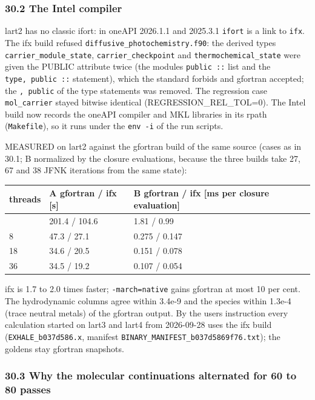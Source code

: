 \documentclass[english,a4paper]{my_memo}
\begin{document}
\subsubsection{30.2 The Intel compiler}\label{302-the-intel-compiler}

lart2 has no classic ifort: in oneAPI 2026.1.1 and 2025.3.1 \texttt{ifort} is a link
to \texttt{ifx}. The ifx build refused \texttt{diffusive\_photochemistry.f90}: the derived
types \texttt{carrier\_module\_state}, \texttt{carrier\_checkpoint} and \texttt{thermochemical\_state}
were given the PUBLIC attribute twice (the module\textquotesingle s \texttt{public\ ::} list and the
\texttt{type,\ public\ ::} statement), which the standard forbids and gfortran
accepted; the \texttt{,\ public} of the type statements was removed. The regression
case \texttt{mol\_carrier} stayed bitwise identical (REGRESSION\_REL\_TOL=0). The Intel
build now records the oneAPI compiler and MKL libraries in its rpath
(\texttt{Makefile}), so it runs under the \texttt{env\ -i} of the run scripts.

MEASURED on lart2 against the gfortran build of the same source (cases as
in 30.1; B normalized by the closure evaluations, because the three builds
take 27, 67 and 38 JFNK iterations from the same state):

{\def\LTcaptype{none} %
{\small
\begin{longtable}[]{@{}lll@{}}
\toprule\noalign{}
threads & A gfortran / ifx {[}s{]} & B gfortran / ifx {[}ms per closure evaluation{]} \\
\midrule\noalign{}
\endhead
\bottomrule\noalign{}
\endlastfoot
1 & 201.4 / 104.6 & 1.81 / 0.99 \\
8 & 47.3 / 27.1 & 0.275 / 0.147 \\
18 & 34.6 / 20.5 & 0.151 / 0.078 \\
36 & 34.5 / 19.2 & 0.107 / 0.054 \\
\end{longtable}
}
}

ifx is 1.7 to 2.0 times faster; \texttt{-march=native} gains gfortran at most 10
per cent. The hydrodynamic columns agree within 3.4e-9 and the species
within 1.3e-4 (trace neutral metals) of the gfortran output. By the user\textquotesingle s
instruction every calculation started on lart3 and lart4 from 2026-09-28
uses the ifx build (\texttt{EXHALE\_b037d586.x}, manifest
\texttt{BINARY\_MANIFEST\_b037d5869f76.txt}); the goldens stay gfortran snapshots.

\subsubsection{30.3 Why the molecular continuations alternated for 60 to 80 passes}\label{303-why-the-molecular-continuations-alternated-for-60-to-80-passes}
\end{document}
